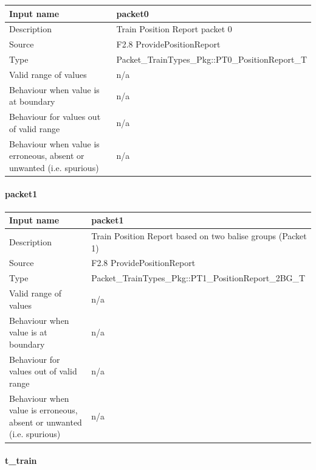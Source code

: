 \begin{longtable}{p{}p{}}
\toprule
Input name				& packet0\\
\midrule
Description				& Train Position Report packet 0  \\
\midrule
Source					& F2.8 ProvidePositionReport \\ 
\midrule
Type					& Packet\_TrainTypes\_Pkg::PT0\_PositionReport\_T\\
\midrule
Valid range of values	& n/a \\
\midrule
Behaviour when value is at boundary	& n/a\\
\midrule
Behaviour for values out of valid range	& n/a\\
\midrule
Behaviour when value is erroneous, absent or unwanted (i.e. spurious) & n/a\\

\bottomrule


\end{longtable}

\paragraph{packet1}

\begin{longtable}{p{}p{}}
\toprule
Input name				& packet1\\
\midrule
Description				& Train Position Report based on two balise groups (Packet 1)  \\
\midrule
Source					& F2.8 ProvidePositionReport \\ 
\midrule
Type					& Packet\_TrainTypes\_Pkg::PT1\_PositionReport\_2BG\_T\\
\midrule
Valid range of values	& n/a \\
\midrule
Behaviour when value is at boundary	& n/a\\
\midrule
Behaviour for values out of valid range	& n/a\\
\midrule
Behaviour when value is erroneous, absent or unwanted (i.e. spurious) & n/a\\

\bottomrule


\end{longtable}


\paragraph{t\_train}

